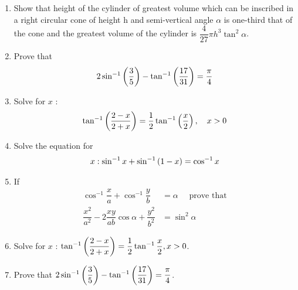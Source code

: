 \begin{enumerate}
    \item Show that height of the cylinder of greatest volume which can be inscribed in a right circular cone of height h and semi-vertical angle $\alpha$ is one-third that of the cone and the greatest volume of the cylinder is $\dfrac{4}{27} \pi h^3 \tan^2 \alpha$.
    \item Prove that
          \begin{align*}
              2\sin^{-1}\left(\dfrac{3}{5}\right)-\tan^{-1}\left(\dfrac{17}{31}\right)=\dfrac{\pi}{4}
          \end{align*}
    \item Solve for $x$ :
          \begin{align*}
              \tan^{-1}\left(\dfrac{2-x}{2+x}\right)=\dfrac{1}{2} \tan^{-1}\left(\dfrac{x}{2}\right),\quad x>0
          \end{align*}

    \item Solve the equation for
          \begin{align*}
              x: \sin^{-1} x + \sin^{-1}\left(1-x\right) = \cos^{-1}x
          \end{align*}
    \item If
          \begin{align*}
              \cos^{-1}\dfrac{x}{a} + \cos^{-1}\dfrac{y}{b}                   & = \alpha \quad \text{ prove that} \\
              \dfrac{x^2}{a^2} -2\dfrac{xy}{ab}\cos \alpha + \dfrac{y^2}{b^2} & = \sin^2 \alpha
          \end{align*}
    \item Solve for $x$ : $ \tan^{-1}\left(\dfrac{2-x}{2+x}\right) = \dfrac{1}{2}\tan^{-1}\dfrac{x}{2}, x>0$.
    \item Prove that $2\sin^{-1}\left(\dfrac{3}{5}\right) - \tan^{-1}\left(\dfrac{17}{31}\right) = \dfrac{\pi}{4}$.
\end{enumerate}
